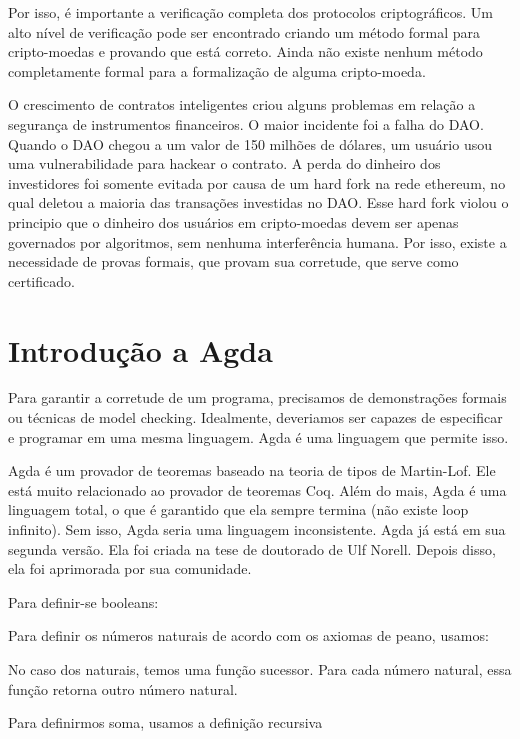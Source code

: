 \documentclass[12pt]{report}
\begin{document}
Por isso, é importante a verificação completa dos protocolos criptográficos. Um alto nível de verificação pode ser encontrado criando um método formal para cripto-moedas e provando que está correto. Ainda não existe nenhum método completamente formal para a formalização de alguma cripto-moeda.

O crescimento de contratos inteligentes criou alguns problemas em relação a segurança de instrumentos financeiros. O maior incidente foi a falha do DAO. Quando o DAO chegou a um valor de 150 milhões de dólares, um usuário usou uma vulnerabilidade para hackear o contrato. A perda do dinheiro dos investidores foi somente evitada por causa de um hard fork na rede ethereum, no qual deletou a maioria das transações investidas no DAO. Esse hard fork violou o principio que o dinheiro dos usuários em cripto-moedas devem ser apenas governados por algoritmos, sem nenhuma interferência humana. Por isso, existe a necessidade de provas formais, que provam sua corretude, que serve como certificado.

\section{Introdução a Agda}

Para garantir a corretude de um programa, precisamos de demonstrações formais ou técnicas de model checking. Idealmente, deveriamos ser capazes de especificar e programar em uma mesma linguagem. Agda é uma linguagem que permite isso.

Agda é um provador de teoremas baseado na teoria de tipos de Martin-Lof. Ele está muito relacionado ao provador de teoremas Coq. Além do mais, Agda é uma linguagem total, o que é garantido que ela sempre termina (não existe loop infinito). Sem isso, Agda seria uma linguagem inconsistente. Agda já está em sua segunda versão. Ela foi criada na tese de doutorado de Ulf Norell. Depois disso, ela foi aprimorada por sua comunidade.

Para definir-se booleans:


Para definir os números naturais de acordo com os axiomas de peano, usamos:


No caso dos naturais, temos uma função sucessor. Para cada número natural, essa função retorna outro número natural.

Para definirmos soma, usamos a definição recursiva
\end{document}
